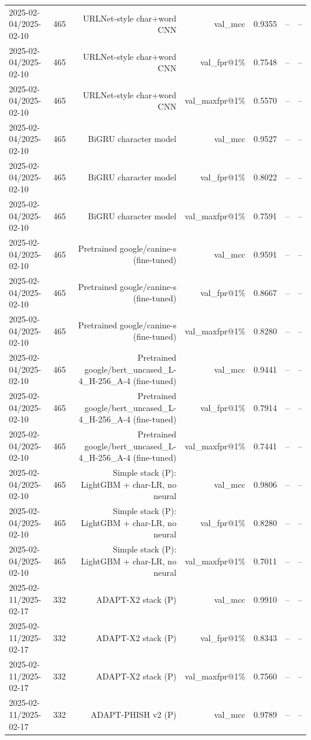 \begin{table}[t]
\begin{tabular}{llrrrrr}
2025-02-04/2025-02-10 & 465 & URLNet-style char+word CNN & val\_mcc & 0.9355 & -- & -- \\
2025-02-04/2025-02-10 & 465 & URLNet-style char+word CNN & val\_fpr@1\% & 0.7548 & -- & -- \\
2025-02-04/2025-02-10 & 465 & URLNet-style char+word CNN & val\_maxfpr@1\% & 0.5570 & -- & -- \\
2025-02-04/2025-02-10 & 465 & BiGRU character model & val\_mcc & 0.9527 & -- & -- \\
2025-02-04/2025-02-10 & 465 & BiGRU character model & val\_fpr@1\% & 0.8022 & -- & -- \\
2025-02-04/2025-02-10 & 465 & BiGRU character model & val\_maxfpr@1\% & 0.7591 & -- & -- \\
2025-02-04/2025-02-10 & 465 & Pretrained google/canine-s (fine-tuned) & val\_mcc & 0.9591 & -- & -- \\
2025-02-04/2025-02-10 & 465 & Pretrained google/canine-s (fine-tuned) & val\_fpr@1\% & 0.8667 & -- & -- \\
2025-02-04/2025-02-10 & 465 & Pretrained google/canine-s (fine-tuned) & val\_maxfpr@1\% & 0.8280 & -- & -- \\
2025-02-04/2025-02-10 & 465 & Pretrained google/bert\_uncased\_L-4\_H-256\_A-4 (fine-tuned) & val\_mcc & 0.9441 & -- & -- \\
2025-02-04/2025-02-10 & 465 & Pretrained google/bert\_uncased\_L-4\_H-256\_A-4 (fine-tuned) & val\_fpr@1\% & 0.7914 & -- & -- \\
2025-02-04/2025-02-10 & 465 & Pretrained google/bert\_uncased\_L-4\_H-256\_A-4 (fine-tuned) & val\_maxfpr@1\% & 0.7441 & -- & -- \\
2025-02-04/2025-02-10 & 465 & Simple stack (P): LightGBM + char-LR, no neural & val\_mcc & 0.9806 & -- & -- \\
2025-02-04/2025-02-10 & 465 & Simple stack (P): LightGBM + char-LR, no neural & val\_fpr@1\% & 0.8280 & -- & -- \\
2025-02-04/2025-02-10 & 465 & Simple stack (P): LightGBM + char-LR, no neural & val\_maxfpr@1\% & 0.7011 & -- & -- \\
2025-02-11/2025-02-17 & 332 & ADAPT-X2 stack (P) & val\_mcc & 0.9910 & -- & -- \\
2025-02-11/2025-02-17 & 332 & ADAPT-X2 stack (P) & val\_fpr@1\% & 0.8343 & -- & -- \\
2025-02-11/2025-02-17 & 332 & ADAPT-X2 stack (P) & val\_maxfpr@1\% & 0.7560 & -- & -- \\
2025-02-11/2025-02-17 & 332 & ADAPT-PHISH v2 (P) & val\_mcc & 0.9789 & -- & -- \\

\end{tabular}
\end{table}
